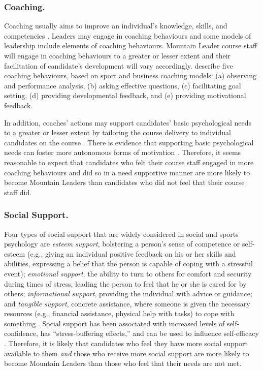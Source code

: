 \documentclass[
  12pt,
  a4paper,
]{book}
\begin{document}
\hypertarget{coaching.}{%
\subsubsection{Coaching.}\label{coaching.}}

Coaching usually aims to improve an individual's knowledge, skills, and competencies \citep{Wagstaff2018}. Leaders may engage in coaching behaviours and some models of leadership \citep[e.g., transformational leadership theory;][]{Bass1985} include elements of coaching behaviours. Mountain Leader course staff will engage in coaching behaviours to a greater or lesser extent and their facilitation of candidate's development will vary accordingly. \citet{Wagstaff2018} describe five coaching behaviours, based on sport and business coaching models: (a) observing and performance analysis, (b) asking effective questions, (c) facilitating goal setting, (d) providing developmental feedback, and (e) providing motivational feedback.

In addition, coaches' actions may support candidates' basic psychological needs to a greater or lesser extent by tailoring the course delivery to individual candidates on the course \citep{Arthur2019, Markland2010}. There is evidence that supporting basic psychological needs can foster more autonomous forms of motivation \citep{Markland2010, Silva2010}. Therefore, it seems reasonable to expect that candidates who felt their course staff engaged in more coaching behaviours and did so in a need supportive manner are more likely to become Mountain Leaders than candidates who did not feel that their course staff did.

\hypertarget{social-support.}{%
\subsubsection{Social Support.}\label{social-support.}}

Four types of social support that are widely considered in social and sports psychology are \emph{esteem support}, bolstering a person's sense of competence or self-esteem (e.g., giving an individual positive feedback on his or her skills and abilities, expressing a belief that the person is capable of coping with a stressful event); \emph{emotional support}, the ability to turn to others for comfort and security during times of stress, leading the person to feel that he or she is cared for by others; \emph{informational support}, providing the individual with advice or guidance; and \emph{tangible support}, concrete assistance, where someone is given the necessary resources (e.g., financial assistance, physical help with tasks) to cope with something \citep[e.g.,][]{Cutrona1990a, Cutrona1990b, Freeman2010, Freeman2014, Rees2007a, Rees2007}. Social support has been associated with increased levels of self-confidence, has ``stress-buffering effects,'' and can be used to influence self-efficacy \citep{Rees2007, Freeman2014, Samson2011}. Therefore, it is likely that candidates who feel they have more social support available to them \emph{and} those who receive more social support are more likely to become Mountain Leaders than those who feel that their needs are not met.
\end{document}
